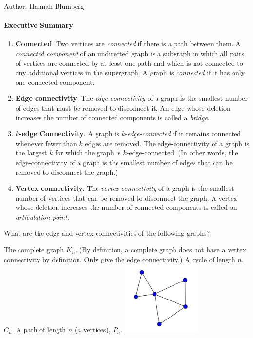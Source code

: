 \documentclass[solution, letterpaper]{cs20inclass}
\begin{document}

\noindent Author: Hannah Blumberg

\paragraph*{Executive Summary}
\begin{enumerate}
  \item \textbf{Connected}. Two vertices are \emph{connected} if there is a path between them. A \emph{connected component} of an undirected graph is a subgraph in which all pairs of vertices are connected by at least one path and which is not connected to any additional vertices in the supergraph. A graph is \emph{connected} if it has only one connected component. 

  \item \textbf{Edge connectivity}. The \emph{edge connectivity} of a graph is the smallest number of edges that must be removed to disconnect it. An edge whose deletion increases the number of connected components is called a \emph{bridge}.  

  \item \textbf{$k$-edge Connectivity}. A graph is \emph{k-edge-connected} if it remains connected whenever fewer than $k$ edges are removed. The edge-connectivity of a graph is the largest $k$ for which the graph is $k$-edge-connected. (In other words, the edge-connectivity of a graph is the smallest number of edges that can be removed to disconnect the graph.)

  \item \textbf{Vertex connectivity}. The \textit{vertex connectivity} of a graph is the smallest number of vertices that can be removed to disconnect the graph. A vertex whose deletion increases the number of connected components is called an \emph{articulation point}.
\end{enumerate}

\problem
What are the edge and vertex connectivities of the following graphs?

\subproblem The complete graph $K_n$. (By definition, a complete graph does not have a vertex connectivity by definition. Only give the edge connectivity.)
\subproblem A cycle of length $n$, $C_n$.
\subproblem A path of length $n$ ($n$ vertices), $P_n$.
\subproblem \includegraphics[width=4cm]{class21-1}
\end{document}
